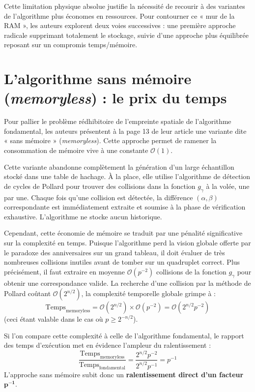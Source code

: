 \documentclass[a4paper,11pt]{article}
\begin{document}
Cette limitation physique absolue justifie la nécessité de recourir à des variantes de l'algorithme plus économes en ressources. Pour contourner ce « mur de la RAM », les auteurs explorent deux voies successives : une première approche radicale supprimant totalement le stockage, suivie d'une approche plus équilibrée reposant sur un compromis temps/mémoire.

\section{L'algorithme sans mémoire (\textit{memoryless}) : le prix du temps}

Pour pallier le problème rédhibitoire de l'empreinte spatiale de l'algorithme fondamental, les auteurs présentent à la page 13 de leur article une variante dite « sans mémoire » (\textit{memoryless}). Cette approche permet de ramener la consommation de mémoire vive à une constante $\mathcal{O}(1)$.

Cette variante abandonne complètement la génération d'un large échantillon stocké dans une table de hachage. À la place, elle utilise l'algorithme de détection de cycles de Pollard \cite{Pollard75} pour trouver des collisions dans la fonction $g_{\gamma}$ à la volée, une par une. Chaque fois qu'une collision est détectée, la différence $(\alpha, \beta)$ correspondante est immédiatement extraite et soumise à la phase de vérification exhaustive. L'algorithme ne stocke aucun historique.

Cependant, cette économie de mémoire se traduit par une pénalité significative sur la complexité en temps. Puisque l'algorithme perd la vision globale offerte par le paradoxe des anniversaires sur un grand tableau, il doit évaluer de très nombreuses collisions inutiles avant de tomber sur un quadruplet correct. Plus précisément, il faut extraire en moyenne $\mathcal{O}(p^{-2})$ collisions de la fonction $g_{\gamma}$ pour obtenir une correspondance valide. La recherche d'une collision par la méthode de Pollard coûtant $\mathcal{O}(2^{n/2})$, la complexité temporelle globale grimpe à :
\begin{equation*}
    \text{Temps}_{\text{memoryless}} = \mathcal{O}(2^{n/2}) \times \mathcal{O}(p^{-2}) = \mathcal{O}(2^{n/2}p^{-2})
\end{equation*}
(ceci étant valable dans le cas où $p \ge 2^{-n/2}$).

Si l'on compare cette complexité à celle de l'algorithme fondamental, le rapport des temps d'exécution met en évidence l'ampleur du ralentissement :
\begin{equation*}
    \frac{\text{Temps}_{\text{memoryless}}}{\text{Temps}_{\text{fondamental}}} = \frac{2^{n/2}p^{-2}}{2^{n/2}p^{-1}} = p^{-1}
\end{equation*}
L'approche sans mémoire subit donc un \textbf{ralentissement direct d'un facteur $\mathbf{p^{-1}}$}.
\end{document}
